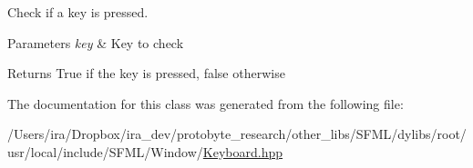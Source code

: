 Check if a key is pressed. 


\begin{DoxyParams}{Parameters}
{\em key} & Key to check\\
\hline
\end{DoxyParams}
\begin{DoxyReturn}{Returns}
True if the key is pressed, false otherwise 
\end{DoxyReturn}


The documentation for this class was generated from the following file\-:\begin{DoxyCompactItemize}
\item 
/\-Users/ira/\-Dropbox/ira\-\_\-dev/protobyte\-\_\-research/other\-\_\-libs/\-S\-F\-M\-L/dylibs/root/usr/local/include/\-S\-F\-M\-L/\-Window/\hyperlink{_keyboard_8hpp}{Keyboard.\-hpp}\end{DoxyCompactItemize}
